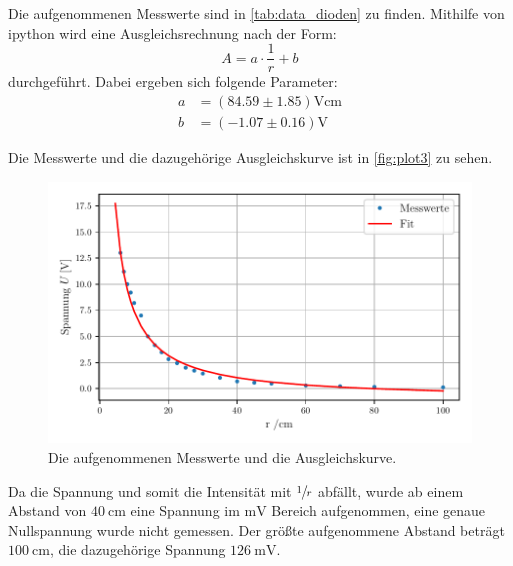 Die aufgenommenen Messwerte sind in \autoref{tab:data_dioden} zu finden.
Mithilfe von ipython wird eine Ausgleichsrechnung nach der Form:
\begin{equation*}
  A = a \cdot \frac{1}{r} + b
\end{equation*}
durchgeführt.
Dabei ergeben sich folgende Parameter:
\begin{align*}
  a &= (84.59 \pm 1.85) \si{\volt\centi\metre}\\
  b &= (-1.07 \pm 0.16) \si{\volt}
\end{align*}

Die Messwerte und die dazugehörige Ausgleichskurve ist in \autoref{fig:plot3} zu sehen.
\begin{figure}
  \centering
  \includegraphics[width=\textwidth]{content/abbildungen/plot3.pdf}
  \caption{Die aufgenommenen Messwerte und die Ausgleichskurve.}
  \label{fig:plot3}
\end{figure}

\noindent
Da die Spannung und somit die Intensität mit $\sfrac{1}{r}$ abfällt, wurde ab einem Abstand von $\SI{40}{\centi\metre}$ eine Spannung im
$\si{\milli\volt}$ Bereich aufgenommen, eine genaue Nullspannung wurde nicht gemessen.
Der größte aufgenommene Abstand beträgt $\SI{100}{\centi\metre}$, die dazugehörige Spannung $\SI{126}{\milli\volt}$.

